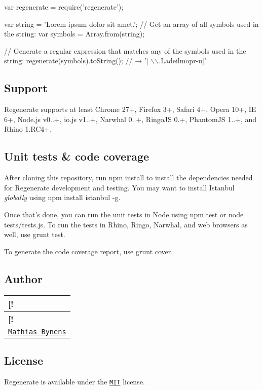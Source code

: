 \begin{DoxyCode}
var regenerate = require('regenerate');

var string = 'Lorem ipsum dolor sit amet.';
// Get an array of all symbols used in the string:
var symbols = Array.from(string);

// Generate a regular expression that matches any of the symbols used in the string:
regenerate(symbols).toString();
// → '[ \(\backslash\)\(\backslash\).Ladeilmopr-u]'
\end{DoxyCode}


\subsection*{Support}

Regenerate supports at least Chrome 27+, Firefox 3+, Safari 4+, Opera 10+, IE 6+, Node.\+js v0..+, io.\+js v1..+, Narwhal 0..+, Ringo\+JS 0.+, Phantom\+JS 1..+, and Rhino 1.\+R\+C4+.

\subsection*{Unit tests \& code coverage}

After cloning this repository, run {\ttfamily npm install} to install the dependencies needed for Regenerate development and testing. You may want to install Istanbul {\itshape globally} using {\ttfamily npm install istanbul -\/g}.

Once that’s done, you can run the unit tests in Node using {\ttfamily npm test} or {\ttfamily node tests/tests.\+js}. To run the tests in Rhino, Ringo, Narwhal, and web browsers as well, use {\ttfamily grunt test}.

To generate the code coverage report, use {\ttfamily grunt cover}.

\subsection*{Author}

\tabulinesep=1mm
\begin{longtabu} spread 0pt [c]{*{1}{|X[-1]}|}
\hline
\rowcolor{\tableheadbgcolor}\textbf{ \mbox{[}!   }\\
\endfirsthead
\hline
\endfoot
\hline
\rowcolor{\tableheadbgcolor}\textbf{ \mbox{[}!   }\\
\endhead
\href{https://mathiasbynens.be/}{\tt Mathias Bynens}   \\
\end{longtabu}


\subsection*{License}

Regenerate is available under the \href{https://mths.be/mit}{\tt M\+IT} license. 